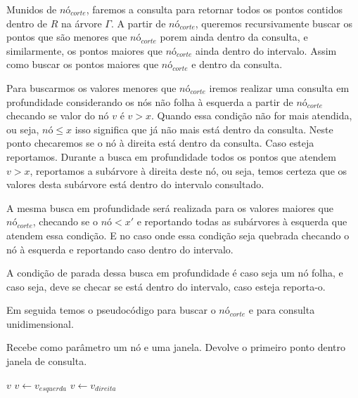 Munidos de $nó_{corte}$, faremos a consulta para retornar todos os pontos contidos dentro de $R$ na árvore
$\Gamma$.
A partir de $nó_{corte}$, queremos recursivamente buscar os pontos que são menores que $nó_{corte}$ porem
ainda dentro da consulta, e similarmente, os pontos maiores que $nó_{corte}$ ainda dentro do intervalo.
Assim como buscar os pontos maiores que $nó_{corte}$ e dentro da consulta. \cite{cg_search1}

Para buscarmos os valores menores que $nó_{corte}$ iremos realizar uma consulta em profundidade considerando
os nós não folha à esquerda a partir de $nó_{corte}$ checando se valor do nó $v$ é $v > x$. 
Quando essa condição não for mais atendida, ou seja, $nó \leq x$  isso significa que já não mais está
dentro da consulta. Neste ponto checaremos se o nó à direita está dentro da consulta. Caso esteja reportamos.
Durante a busca em profundidade todos os pontos que atendem $v > x$, reportamos a subárvore à direita
deste nó, ou seja, temos certeza que os valores desta subárvore está dentro do intervalo consultado.


A mesma busca em profundidade será realizada para os valores maiores que $nó_{corte}$, checando se 
o $nó < x'$ e reportando todas as subárvores à esquerda que atendem essa condição. E no caso onde essa
condição seja quebrada checando o nó à esquerda e reportando caso dentro do intervalo.

A condição de parada dessa busca em profundidade é caso seja um nó folha, e caso seja, deve se checar
se está dentro do intervalo, caso esteja reporta-o.

Em seguida temos o pseudocódigo para buscar o $nó_{corte}$ e para consulta unidimensional.

\begin{algorithm}[h!]
    \caption{Recebe como parâmetro um nó e uma janela. Devolve o primeiro ponto dentro janela de consulta.}
    \begin{algorithmic}[1]
            \Return $v$
        \Else
                \State $v \leftarrow v_{esquerda}$ 
            \Else
                \State $v \leftarrow v_{direita}$
            \EndIf
        \EndIf
        \EndWhile
    \EndFunction
    \end{algorithmic}
\end{algorithm}


